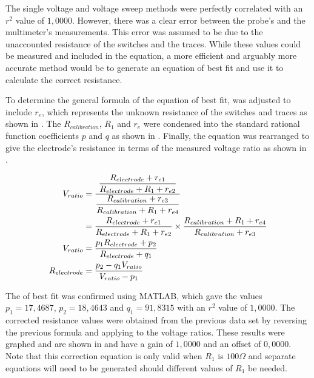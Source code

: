 The single voltage and voltage sweep methods were perfectly correlated with an $r^2$ value of $1,0000$.
However, there was a clear error between the probe's and the multimeter's measurements.
This error was assumed to be due to the unaccounted resistance of the switches and the traces.
While these values could be measured and included in the equation, a more efficient and arguably more accurate method would be to generate an equation of best fit and use it to calculate the correct resistance.


To determine the general formula of the equation of best fit,  was adjusted to include $r_e$, which represents the unknown resistance of the switches and traces as shown in .
The $R_{calibration}$, $R_1$ and $r_e$ were condensed into the standard rational function coefficients $p$ and $q$ as shown in .
Finally, the equation was rearranged to give the electrode's resistance in terms of the measured voltage ratio as shown in .

\begin{align}
 V_{ratio} &= \frac{\displaystyle\frac{\displaystyle R_{electrode} + r_{e1}}{\displaystyle R_{electrode} + R_1 + r_{e2}}}{\displaystyle\frac{\displaystyle R_{calibration} + r_{e3}}{\displaystyle R_{calibration} + R_1 + r_{e4}}} \nonumber \\
    &= \frac{\displaystyle R_{electrode} + r_{e1}}{\displaystyle R_{electrode} + R_1 + r_{e2}} \times \frac{\displaystyle R_{calibration} + R_1 + r_{e4}}{\displaystyle R_{calibration} + r_{e3}} \label{eqn:resistance-measuring} \\
 V_{ratio} &= \frac{\displaystyle p_1 R_{electrode} + p_2}{\displaystyle R_{electrode} + q_1} \label{eqn:resistance-measuring-rational} \\
 R_{electrode} &= \frac{\displaystyle p_2 - q_1 V_{ratio}}{\displaystyle V_{ratio} - p_1} \label{eqn:resistance-measuring-rearranged}
\end{align}

The  of best fit was confirmed using MATLAB, which gave the values $p_1 = 17,4687$, $p_2 = 18,4643$ and $q_1 = 91,8315$ with an $r^2$ value of $1,0000$. 
The corrected resistance values were obtained from the previous data set by reversing the previous formula and applying  to the voltage ratios.
These results were graphed and are shown in  and have a gain of $1,0000$ and an offset of $0,0000$.
Note that this correction equation is only valid when $R_1$ is $100\Omega$ and separate equations will need to be generated should different values of $R_1$ be needed.

